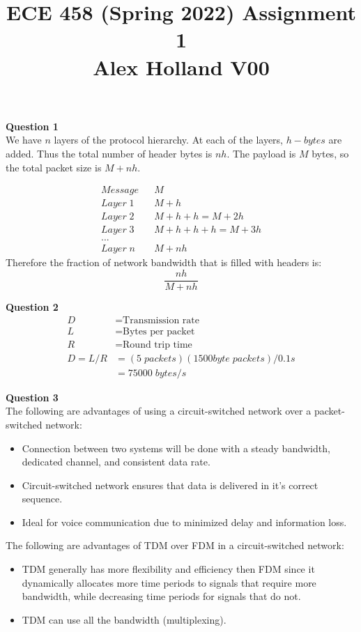 \documentclass{article}
\title{%
   ECE 458 (Spring 2022) Assignment 1 \\
   \large Alex Holland V00}
\date{}
\begin{document}
\maketitle

{\bf Question 1}\\
We have $n$ layers of the protocol hierarchy. At each of the layers, $h-bytes$ are added. Thus the total number of header bytes is $nh$. The payload is $M$ bytes, so the total packet size is $M+nh$.

\begin{align*}
Message && M\\
Layer\;1 && M+h\\
Layer\;2 && M+h+h=M+2h\\
Layer\;3 && M+h+h+h=M+3h\\
...\\
Layer\;n && M+nh
\end{align*}
Therefore the fraction of network bandwidth that is filled with headers is:
\begin{equation*}
    \frac{nh}{M+nh}
\end{equation*}

{\bf Question 2}\\
\begin{equation*}
    \begin{split}
    D &= \text{Transmission rate}\\
    L &= \text{Bytes per packet}\\
    R &= \text{Round trip time}\\ 
    D=L/R &= (5 \; packets)(1500byte \; packets)/0.1s\\
    &= 75000 \; bytes/s
    \end{split}
\end{equation*}

{\bf Question 3}\\
The following are advantages of using a  circuit-switched network over a packet-switched network:
\begin{itemize}
    \item Connection between two systems will be done with a steady bandwidth, dedicated channel, and consistent data rate.
    \item Circuit-switched network ensures that data is delivered in it's correct sequence.
    \item Ideal for voice communication due to minimized delay and information loss.
\end{itemize}
The following are advantages of TDM over FDM in a circuit-switched network:
\begin{itemize}
    \item TDM generally has more flexibility and efficiency then FDM since it dynamically allocates more time periods to signals that require more bandwidth, while decreasing time periods for signals that do not. 
    \item TDM can use all the bandwidth (multiplexing).
\end{itemize}
\end{document}
